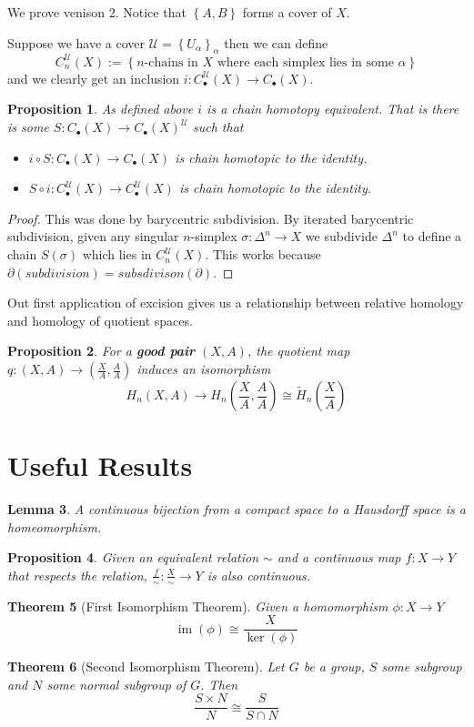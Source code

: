 \documentclass[11pt]{article}
\newcommand{\defeq}{:=}
\DeclareMathOperator{\im}{\mathrm{im}}
\newtheorem{theorem}{Theorem}[section]
\newtheorem{lemma}[theorem]{Lemma}
\newtheorem{prop}[theorem]{Proposition}
\begin{document}
We prove venison 2.
Notice that $\left\{ A, B\right\}$ forms a cover of $X$.

Suppose we have a cover $\mathcal{U}=\left\{ U_\alpha\right\}_\alpha$ then we can define
\[
	C_n^\mathcal{U}(X) \defeq\left\{ n\text{-chains in }X\text{ where each simplex lies in some }\alpha\right\}
\]
and we clearly get an inclusion $i: C_\bullet^\mathcal{U}(X) \to C_\bullet(X)$.

\begin{prop}
As defined above $i$ is a chain homotopy equivalent.
That is there is some $S:C_\bullet(X) \to C_\bullet(X)^\mathcal{U}$ such that
\begin{itemize}
	\item $i \circ S: C_\bullet(X) \to C_\bullet(X)$ is chain homotopic to the identity.
	\item $S \circ i: C_\bullet^\mathcal{U}(X) \to C_\bullet^\mathcal{U}(X)$ is chain homotopic to the identity.
\end{itemize}
\end{prop}

\begin{proof}
This was done by barycentric subdivision.
By iterated barycentric subdivision, given any singular $n$-simplex $\sigma:\Delta^n\to X$ we subdivide $\Delta^n$ to define a chain $S(\sigma)$ which lies in $C_n^\mathcal{U}(X)$.
This works because $\partial(subdivision) = subsdivison(\partial)$.
\end{proof}

Out first application of excision gives us a relationship between relative homology and homology of quotient spaces.

\begin{prop}
For a \textbf{good pair} $(X, A)$, the quotient map $q: (X, A) \to \left( \frac{X}{A}, \frac{A}{A}\right)$ induces an isomorphism
\[
H_n(X, A) \to H_n\left( \frac{X}{A}, \frac{A}{A}\right) \cong \widetilde{H}_n\left(\frac{X}{A}\right)
\]
\end{prop}

\section{Useful Results}
\begin{lemma}
A continuous bijection from a compact space to a Hausdorff space is a homeomorphism.
\end{lemma}

\begin{prop}
Given an equivalent relation $\sim$ and a continuous map $f:X\to Y$ that respects the relation, $\frac{f}{\sim}:\frac{X}{\sim}\to Y$ is also continuous.
\end{prop}

\begin{theorem}[First Isomorphism Theorem]
Given a homomorphism $\phi:X\to Y$
\[
	\im(\phi) \cong \frac{X}{\ker(\phi)}
\]
\end{theorem}

\begin{theorem}[Second Isomorphism Theorem]
Let $G$ be a group, $S$ some subgroup and $N$ some normal subgroup of $G$.
Then
\[
	\frac{S\times N}{N}\cong\frac{S}{S\cap N}
\]
\end{theorem}
\end{document}
